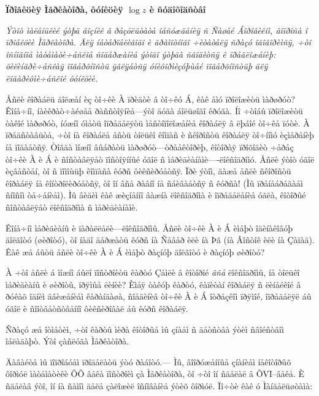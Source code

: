 \documentclass[12pt,a4paper]{amsart}
\author{{\sc Î.~Ì.~Õóäàâåðäÿí}}
\begin{document}
\centerline {\bf  Ïðîåêöèÿ Ìåðêàòîðà, ôóíêöèÿ $\log z$  è ñóäîõîäñòâî}


\medskip



      {\it Ýòîò ìàëåíüêèé ýòþä âîçíèê â ðåçóëüòàòå îáñóæäåíèÿ ñ Ñàøåé Áîðîâèêîì, âîïðîñà
      î ïðîåêöèè Ìåðêàòîðà. Äëÿ íåòåðïåëèâîãî è ãðàìîòíîãî ÷èòàòåëÿ ñðàçó îãîâîðèìñÿ, ÷òî îñíîâíîå
      ìàòåìàòè÷åñêîå ñîäåðæàíèå ýòîãî ýòþäà ñâîäèòñÿ ê ïðåäëîæåíèþ: öèëèíäðè÷åñêàÿ ïîâåðõíîñòü
      ÿâëÿåòñÿ óíèôîðìèçóþùåé ïîâåðõíîñòüþ äëÿ ëîãàðèôìè÷åñêîé ôóíêöèè.}

 \medskip


   Åñëè êîðàáëü äîëæåí èç òî÷êè À ïðèäòè â òî÷êó Á, êàê åìó ïðîëîæèòü  ìàðøðóò?
   Êîíå÷íî, íàèêðàò÷àéøåå ðàññòîÿíèå---ýòî äóãà áîëüøîãî êðóãà. Íî ÷òîáû ïðîëîæèòü
   òàêîé ìàðøðóò, íóæíî óìåòü îïðåäåëÿòü ìåñòîïîëîæåíèå êîðàáëÿ â ëþáîé òî÷êå ïóòè.
   À ïðåäñòàâüòå, ÷òî íà êîðàáëå åñòü òîëüêî êîìïàñ è ñêîðîñòü êîðàáëÿ òî÷íîìó èçìåðåíèþ íå ïîäàåòñÿ.
    Òîãäà ìîæíî  âûáðàòü ìàðøðóò---òðàåêòîðèþ,
   êîòîðàÿ ïðîõîäèò ÷åðåç òî÷êè À è Á è ñîñòàâëÿåò ïîñòîÿííûé óãîë ñ ìåðèäèàíàìè----ëîêñîäðîìó.
   Åñëè ýòîò óãîë èçâåñòåí, òî ñ ïîìîùüþ êîìïàñà êóðñ ôèêñèðóåòñÿ. Ïðè ýòîì,
   äàæå åñëè ñêîðîñòü êîðàáëÿ íå êîíòðîëèðóåòñÿ, òî îí âñå ðàâíî íå ñáèâàåòñÿ ñ êóðñà!
   (Ìû ïðåíåáðåãàåì ñíîñîì òå÷åíèåì). Ìû âèäèì êàê æèçíåííî âàæíà ëîêñîäðîìà è
    îïðåäåëåíèå óãëà, êîòîðûé ñîñòàâëÿåò
   ëîêñîäðîìà ñ ìåðèäèàíàìè.

   Êîíå÷íî ìåðèäèàíû è ïàðàëëåëè---ëîêñîäðîìû. Åñëè òî÷êè À è Á èìåþò îäèíàêîâóþ äîëãîòó (øèðîòó),
   òî íàäî äåðæàòü êóðñ íà Ñåâåð èëè íà Þã (íà Âîñòîê èëè íà Çàïàä).
   Êàê æå áûòü åñëè òî÷êè  À è Á èìåþò ðàçíóþ äîëãîòó è ðàçíóþ øèðîòó?

    À ÷òî åñëè á ìîæíî áûëî ïîñòðîèòü êàðòó Çåìëè â êîòîðîé {\it âñå} ëîêñîäðîìû, íå òîëüêî
    ìåðèäèàíû è øèðîòû, ïðÿìûå ëèíèè?
    Èìåÿ òàêóþ êàðòó, êàïèòàí êîðàáëÿ ñ ëèíåéêîé â ðóêàõ îäíèì äâèæåíèåì êàðàíäàøà,
    ñîåäèíèâ òî÷êè À è Á îòðåçêîì ïðÿìîé, îïðåäåëÿë áû óãîë
    è ñîîòâåòñòâåííî ôèêñèðîâàë áû êóðñ êîðàáëÿ.

   Ñðàçó æå îòìåòèì, ÷òî êàðòû ìèðà êîòîðûå ìû çíàåì ñ äåòñòâà ýòèì ñâîéñòâîì îáëàäàþò.
      Ýòî çàñëóãà Ìåðêàòîðà.


   Äàâàéòå ìû ïîïðîáóåì ïðîäåëàòü ýòó ðàáîòó.--- Ìû, âîîðóæåííûå çíàíèåì íåêîòîðûõ ôîðìóë
   ìàòåìàòèêè ÕÕ âåêà ïîñòðîèì
   çà Ìåðêàòîðà, òî ÷òî îí ñäåëàë â ÕVI--âåêå. È ñäåëàâ ýòî, îí íà ñàìîì äåëå çàëîæèë îñíîâàíèå ýòèõ ôîðìóë.
      Ïî÷òè êàê ó Ìàíäåëüøòàìà:
\end{document}
